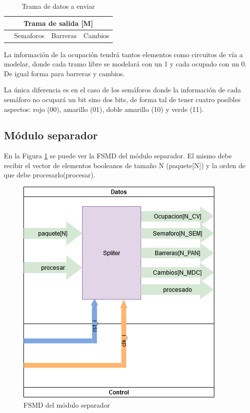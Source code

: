 	\begin{table}[!hbt]
	\renewcommand{\arraystretch}{1.3}
	\caption{Trama de datos a enviar}
	\label{Trama_out}
	\centering
	\begin{tabular}{| c | c | c | c |}
	\multicolumn{4}{c}{Trama de salida [M]} \\
	\hline
	 & Semaforos & Barreras & Cambios \\
	\hline	
	\end{tabular}
	\end{table}	
	 
	La información de la ocupación tendrá tantos elementos como circuitos de vía a modelar, donde cada tramo libre se modelará con un 1 y cada ocupado con un 0. De igual forma para barreras y cambios.
	
	La única diferencia es en el caso de los semáforos donde la información de cada semáforo no ocupará un bit sino dos bits, de forma tal de tener cuatro posibles aspectos: rojo (00), amarillo (01), doble amarillo (10) y verde (11).
	 
	\subsection{Módulo separador}
	
		En la Figura \ref{fig:FSMD_Separador} se puede ver la FSMD del módulo separador. El mismo debe recibir el vector de elementos booleanos de tamaño N (paquete[N]) y la orden de que debe procesarlo(procesar). 
		\begin{figure}[h]
		\centering
			\includegraphics[scale=.5]{./Figures/FSMD-Separador}
			\caption{FSMD del módulo separador}
			\label{fig:FSMD_Separador}
		\end{figure}
		

